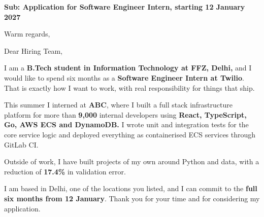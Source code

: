 \documentclass[11pt,a4paper,roman]{moderncv}
\begin{document}
\date{19 September 2026}
\opening{\textcolor{color1}{\textbf{Sub: Application for Software Engineer Intern, starting 12 January 2027}}}
\closing{Warm regards, \vspace{-1em}}


\makelettertitle

Dear Hiring Team,

I am a \textbf{B.Tech student in Information Technology at FFZ, Delhi,} and I would like to spend six months as a \textbf{Software Engineer Intern at Twilio}. That is exactly how I want to work, with real responsibility for things that ship.

This summer I interned at \textbf{ABC}, where I built a full stack infrastructure platform for more than \textbf{9,000} internal developers using \textbf{React, TypeScript, Go, AWS ECS and DynamoDB.} I wrote unit and integration tests for the core service logic and deployed everything as containerised ECS services through GitLab CI.

Outside of work, I have built projects of my own around Python and data, with a reduction of \textbf{17.4\%} in validation error.

I am based in Delhi, one of the locations you listed, and I can commit to the \textbf{full six months from 12 January}. Thank you for your time and for considering my application.

\makeletterclosing
\end{document}
